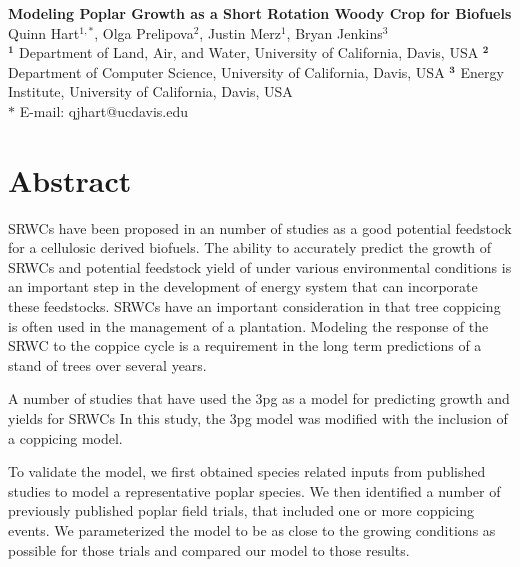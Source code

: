 \documentclass[10pt]{article}
\date{}
\begin{document}
\begin{flushleft}
{\Large
\textbf{Modeling Poplar Growth as a Short Rotation Woody Crop for Biofuels}
}
\\
Quinn Hart$^{1,\ast}$,
Olga Prelipova$^{2}$,
Justin Merz$^{1}$,
Bryan Jenkins$^{3}$
\\
$^{\textbf{1}}$ Department of Land, Air, and Water, University of California, Davis, USA
$^{\textbf{2}}$ Department of Computer Science, University of California, Davis, USA
$^{\textbf{3}}$ Energy Institute, University of California, Davis, USA
\\
$\ast$ E-mail: qjhart@ucdavis.edu
\end{flushleft}

\section*{Abstract}

\acp{SRWC} have been proposed in an number of studies as a good
potential feedstock for a cellulosic derived biofuels.  The ability to
accurately predict the growth of \acp{SRWC} and potential feedstock
yield of under various environmental conditions is an important step
in the development of energy system that can incorporate these
feedstocks.  \acp{SRWC} have an important consideration in that
tree coppicing is often used in the management of a plantation.  Modeling
the response of the \ac{SRWC} to the coppice cycle is a requirement in
the long term predictions of a stand of trees over several years.

A number of studies that have used the \ac{3pg} as a model for
predicting growth and yields for \acp{SRWC} In this study, the
\ac{3pg} model was modified with the inclusion of a
coppicing model.

To validate the model, we first obtained species related
inputs from published studies to model a representative poplar
species.  We then identified a number of previously published poplar
field trials, that included one or more coppicing events.  We
parameterized the model to be as close to the growing conditions as
possible for those trials and compared our model to those results.
 
\end{document}

